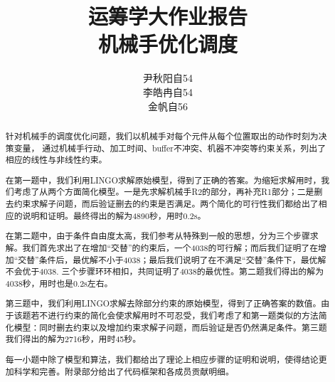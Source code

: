 \documentclass{ctexart}
\begin{document}
\title{\textsf{运筹学大作业报告} \\
 \large 机械手优化调度}
\author{尹秋阳\quad 自54\\ 李皓冉\quad 自54\\ 金帆\quad 自56}
\maketitle

\begin{abstract}
    针对机械手的调度优化问题，我们以机械手对每个元件从每个位置取出的动作时刻为决策变量，
    通过机械手行动、加工时间、buffer不冲突、机器不冲突等约束关系，列出了相应的线性与非线性约束。
    
    在第一题中，我们利用LINGO求解原始模型，得到了正确的答案。为缩短求解用时，我们考虑了从两个方面简化模型。一是先求解机械手R2的部分，再补充R1部分；二是删去约束求解子问题，而后验证删去的约束是否满足。两个简化的可行性我们都给出了相应的说明和证明。最终得出的解为4890秒，用时0.2s。
    
    在第二题中，由于条件自由度太高，我们参考从特殊到一般的思想，分为三个步骤求解。我们首先求出了在增加“交替”的约束后，一个4038的可行解；而后我们证明了在增加“交替”条件后，最优解不小于4038；最后我们说明了在不满足“交替”条件下，最优解不会优于4038. 三个步骤环环相扣，共同证明了4038的最优性。第二题我们得出的解为4038秒，用时也是0.2s左右。
    
    第三题中，我们利用LINGO求解去除部分约束的原始模型，得到了正确答案的数值。由于该题若不进行约束的简化会使求解用时不可忍受，我们考虑了和第一题类似的方法简化模型：同时删去约束以及增加约束求解子问题，而后验证是否仍然满足条件。第三题我们得出的解为2716秒，用时45秒。
    
    每一小题中除了模型和算法，我们都给出了理论上相应步骤的证明和说明，使得结论更加科学和完善。附录部分给出了代码框架和各成员贡献明细。

	\vspace{10pt}
	
\end{abstract}
\clearpage

\tableofcontents
\clearpage
\end{document}
